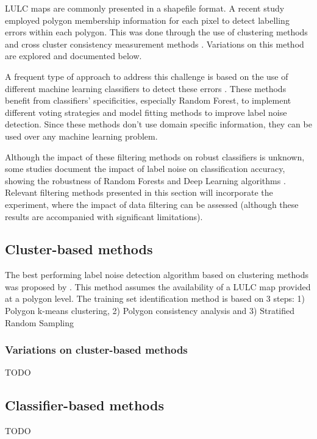 \documentclass[12pt, english, openany]{book}
\begin{document}
LULC maps are commonly presented in a shapefile format. A recent study
employed polygon membership information for each pixel to detect labelling
errors within each polygon. This was done through the use of clustering methods
and cross cluster consistency measurement methods \cite{Paris2019}. Variations
on this method are explored and documented below.

A frequent type of approach to address this challenge is based on the use of
different machine learning classifiers to detect these errors
\cite{Brodley1999, Jiang2004, Liu2008, Yuan2018, Zhang2018,
Pelletier2017Filtering, Garcia-Gil2019, Boukir2019, Zhang2019}. These methods
benefit from classifiers' specificities, especially Random Forest, to implement
different voting strategies and model fitting methods to improve label noise
detection. Since these methods don't use domain specific information, they can
be used over any machine learning problem.

Although the impact of these filtering methods on robust classifiers is
unknown, some studies document the impact of label noise on classification
accuracy, showing the robustness of Random Forests and Deep Learning algorithms
\cite{Pelletier2017Effect, Rolnick2017}. Relevant filtering methods presented
in this section will incorporate the experiment, where the impact of data
filtering can be assessed (although these results are accompanied with
significant limitations).

\subsection*{Cluster-based methods}

The best performing label noise detection algorithm based on clustering methods was proposed by \cite{Paris2019}. This method assumes the availability of a LULC map provided at a polygon level. The training set identification method is based on 3 steps: 1) Polygon k-means clustering, 2) Polygon consistency analysis and 3) Stratified Random Sampling

\subsubsection{Variations on cluster-based methods}
TODO

\subsection*{Classifier-based methods}
TODO
\end{document}
